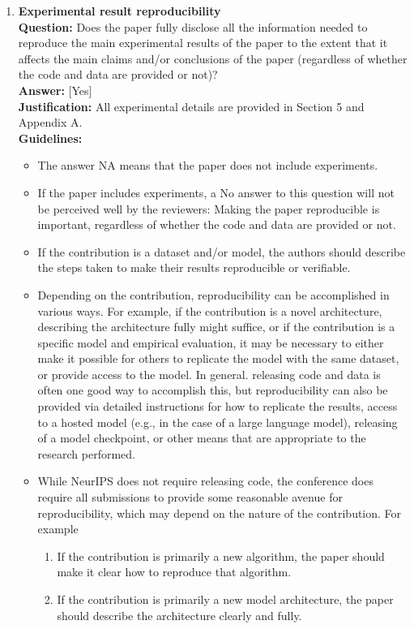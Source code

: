 \begin{enumerate}
\item \textbf{Experimental result reproducibility}\\
\textbf{Question:} Does the paper fully disclose all the information needed to reproduce the main experimental results of the paper to the extent that it affects the main claims and/or conclusions of the paper (regardless of whether the code and data are provided or not)?\\
\textbf{Answer:} [Yes]\\
\textbf{Justification:} All experimental details are provided in Section 5 and Appendix A.\\
\textbf{Guidelines:}
\begin{itemize}
\item The answer NA means that the paper does not include experiments.
\item If the paper includes experiments, a No answer to this question will not be perceived well by the reviewers: Making the paper reproducible is important, regardless of whether the code and data are provided or not.
\item If the contribution is a dataset and/or model, the authors should describe the steps taken to make their results reproducible or verifiable.
\item Depending on the contribution, reproducibility can be accomplished in various ways. For example, if the contribution is a novel architecture, describing the architecture fully might suffice, or if the contribution is a specific model and empirical evaluation, it may be necessary to either make it possible for others to replicate the model with the same dataset, or provide access to the model. In general. releasing code and data is often one good way to accomplish this, but reproducibility can also be provided via detailed instructions for how to replicate the results, access to a hosted model (e.g., in the case of a large language model), releasing of a model checkpoint, or other means that are appropriate to the research performed.
\item While NeurIPS does not require releasing code, the conference does require all submissions to provide some reasonable avenue for reproducibility, which may depend on the nature of the contribution. For example
\begin{enumerate}
\item[(a)] If the contribution is primarily a new algorithm, the paper should make it clear how to reproduce that algorithm.
\item[(b)] If the contribution is primarily a new model architecture, the paper should describe the architecture clearly and fully.

\end{enumerate}
\end{itemize}
\end{enumerate}
